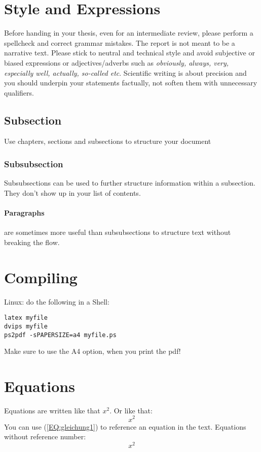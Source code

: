 \documentclass[a4paper,twoside, openright,12pt]{report}
\begin{document}
\section{Style and Expressions}

Before handing in your thesis, even for an intermediate review, please perform a spellcheck and correct grammar mistakes. The report is not meant to be a narrative text. Please stick to neutral and technical style and avoid subjective or biased expressions or adjectives/adverbs such as \emph{obviously, always, very, especially well, actually, so-called etc}. Scientific writing is about precision and you should underpin your statements factually, not soften them with unnecessary qualifiers.

\subsection{Subsection}

Use chapters, sections and subsections to structure your document

\subsubsection{Subsubsection}

Subsubsections can be used to further structure information within a subsection. They don't show up in your list of contents.

\paragraph{Paragraphs} are sometimes more useful than subsubsections to structure text without breaking the flow.

\section{Compiling}
Linux: 
do the following in a Shell:\\
\begin{verbatim}
latex myfile
dvips myfile
ps2pdf -sPAPERSIZE=a4 myfile.ps
\end{verbatim}
Make sure to use the A4 option, when you print the pdf!

\section{Equations}
Equations are written like that $x^2$. Or like that:
\begin{equation}
x^2
\label{EQ:gleichung1}
\end{equation}
You can use (\ref{EQ:gleichung1}) to reference an equation in the
text. Equations without reference number:
\[
x^2
\]
\end{document}
